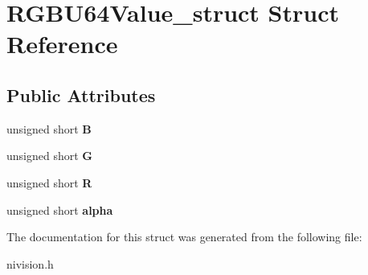 \hypertarget{structRGBU64Value__struct}{
\section{RGBU64Value\_\-struct Struct Reference}
\label{structRGBU64Value__struct}
}
\subsection*{Public Attributes}
\begin{DoxyCompactItemize}
\item 
\hypertarget{structRGBU64Value__struct_afd5efbf1d815f520aba6560ca0567c73}{
unsigned short {\bfseries B}}
\label{structRGBU64Value__struct_afd5efbf1d815f520aba6560ca0567c73}

\item 
\hypertarget{structRGBU64Value__struct_a81030d0b0c318f8f306da68f2ac2d653}{
unsigned short {\bfseries G}}
\label{structRGBU64Value__struct_a81030d0b0c318f8f306da68f2ac2d653}

\item 
\hypertarget{structRGBU64Value__struct_a044393f692dace720592b01f91c3a668}{
unsigned short {\bfseries R}}
\label{structRGBU64Value__struct_a044393f692dace720592b01f91c3a668}

\item 
\hypertarget{structRGBU64Value__struct_aaf4921d6a030573712730e5d83ceb3d6}{
unsigned short {\bfseries alpha}}
\label{structRGBU64Value__struct_aaf4921d6a030573712730e5d83ceb3d6}

\end{DoxyCompactItemize}


The documentation for this struct was generated from the following file:\begin{DoxyCompactItemize}
\item 
nivision.h\end{DoxyCompactItemize}
